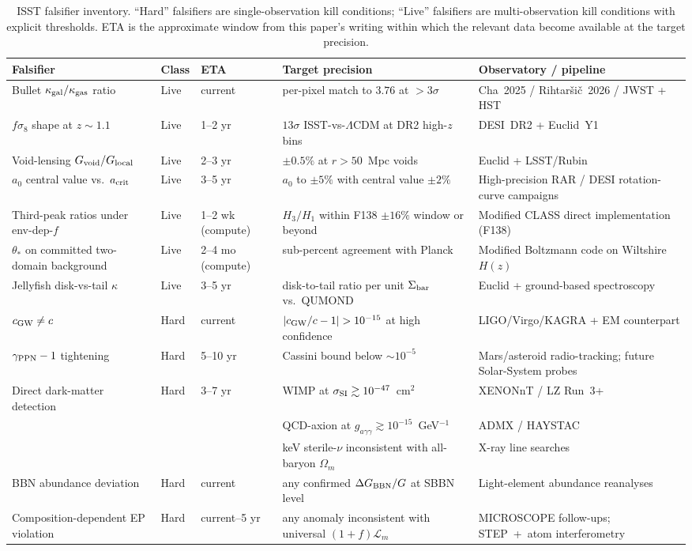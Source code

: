 \documentclass[aps,prd,twocolumn,nofootinbib,floatfix,superscriptaddress]{revtex4-2}
\newcommand{\Lm}{\mathcal{L}_m}
\begin{document}
\begin{table}[t]
\caption{ISST falsifier inventory. ``Hard'' falsifiers are
single-observation kill conditions; ``Live'' falsifiers are
multi-observation kill conditions with explicit thresholds. ETA is
the approximate window from this paper's writing within which the
relevant data become available at the target precision.}
\label{tab:falsifiers}
\begin{ruledtabular}
\begin{tabular}{lllll}
Falsifier & Class & ETA & Target precision & Observatory / pipeline \\
\hline
Bullet $\kappa_{\rm gal}/\kappa_{\rm gas}$ ratio
& Live & current
& per-pixel match to $3.76$ at $>3\sigma$
& Cha~2025 / Rihtar\v{s}i\v{c}~2026 / JWST + HST \\
$f\sigma_8$ shape at $z\sim 1.1$
& Live & 1--2 yr
& $13\sigma$ ISST-vs-$\Lambda$CDM at DR2 high-$z$ bins
& DESI~DR2 + Euclid~Y1 \\
Void-lensing $G_{\rm void}/G_{\rm local}$
& Live & 2--3 yr
& $\pm 0.5\%$ at $r > 50$~Mpc voids
& Euclid + LSST/Rubin \\
$a_0$ central value vs.\ $a_{\rm crit}$
& Live & 3--5 yr
& $a_0$ to $\pm 5\%$ with central value $\pm 2\%$
& High-precision RAR / DESI rotation-curve campaigns \\
Third-peak ratios under env-dep-$f$
& Live & 1--2 wk (compute)
& $H_3/H_1$ within F138 $\pm 16\%$ window or beyond
& Modified CLASS direct implementation (F138) \\
$\theta_*$ on committed two-domain background
& Live & 2--4 mo (compute)
& sub-percent agreement with Planck
& Modified Boltzmann code on Wiltshire~$H(z)$ \\
Jellyfish disk-vs-tail $\kappa$
& Live & 3--5 yr
& disk-to-tail ratio per unit $\Sigma_{\rm bar}$ vs.\ QUMOND
& Euclid + ground-based spectroscopy \\
$c_{\rm GW}\neq c$
& Hard & current
& $|c_{\rm GW}/c-1|>10^{-15}$ at high confidence
& LIGO/Virgo/KAGRA + EM counterpart \\
$\gamma_{\rm PPN}-1$ tightening
& Hard & 5--10 yr
& Cassini bound below $\sim 10^{-5}$
& Mars/asteroid radio-tracking; future Solar-System probes \\
Direct dark-matter detection
& Hard & 3--7 yr
& WIMP at $\sigma_{\rm SI}\gtrsim 10^{-47}$~cm$^2$
& XENONnT / LZ Run~3+ \\
& & & QCD-axion at $g_{a\gamma\gamma}\gtrsim 10^{-15}$~GeV$^{-1}$
& ADMX / HAYSTAC \\
& & & keV sterile-$\nu$ inconsistent with all-baryon $\Omega_m$
& X-ray line searches \\
BBN abundance deviation
& Hard & current
& any confirmed $\Delta G_{\rm BBN}/G$ at SBBN level
& Light-element abundance reanalyses \\
Composition-dependent EP violation
& Hard & current--5 yr
& any anomaly inconsistent with universal $(1{+}f)\Lm$
& MICROSCOPE follow-ups; STEP~+~atom interferometry \\
\end{tabular}
\end{ruledtabular}
\end{table}
\end{document}
